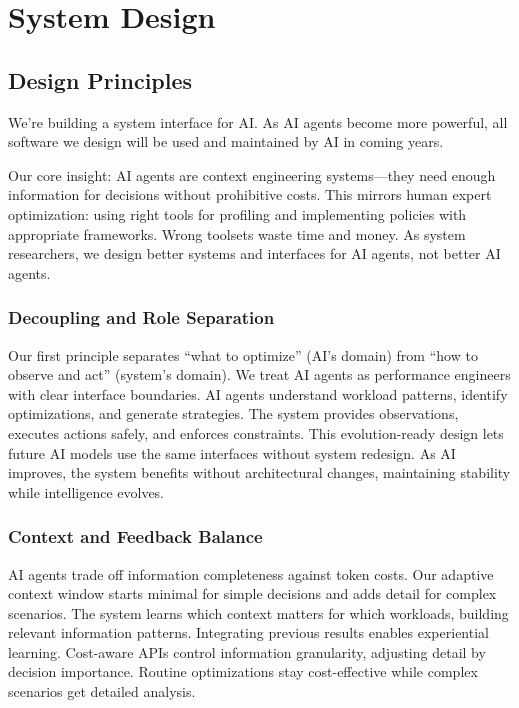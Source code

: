 \section{System Design}

\subsection{Design Principles}

We're building a system interface for AI. As AI agents become more powerful, all software we design will be used and maintained by AI in coming years.

Our core insight: AI agents are context engineering systems—they need enough information for decisions without prohibitive costs. This mirrors human expert optimization: using right tools for profiling and implementing policies with appropriate frameworks. Wrong toolsets waste time and money. As system researchers, we design better systems and interfaces for AI agents, not better AI agents.

\subsubsection{Decoupling and Role Separation}
Our first principle separates ``what to optimize'' (AI's domain) from ``how to observe and act'' (system's domain). We treat AI agents as performance engineers with clear interface boundaries. AI agents understand workload patterns, identify optimizations, and generate strategies. The system provides observations, executes actions safely, and enforces constraints. This evolution-ready design lets future AI models use the same interfaces without system redesign. As AI improves, the system benefits without architectural changes, maintaining stability while intelligence evolves.

\subsubsection{Context and Feedback Balance}
AI agents trade off information completeness against token costs. Our adaptive context window starts minimal for simple decisions and adds detail for complex scenarios. The system learns which context matters for which workloads, building relevant information patterns. Integrating previous results enables experiential learning. Cost-aware APIs control information granularity, adjusting detail by decision importance. Routine optimizations stay cost-effective while complex scenarios get detailed analysis.


